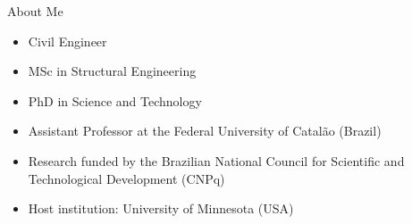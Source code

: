 \begin{frame}{About Me}

\begin{itemize}
    \item Civil Engineer
    \item MSc in Structural Engineering
    \item PhD in Science and Technology
    \item Assistant Professor at the Federal University of Catalão (Brazil)
    \item Research funded by the Brazilian National Council for Scientific and Technological Development (CNPq)
    \item Host institution: University of Minnesota (USA)
\end{itemize}

\end{frame}
